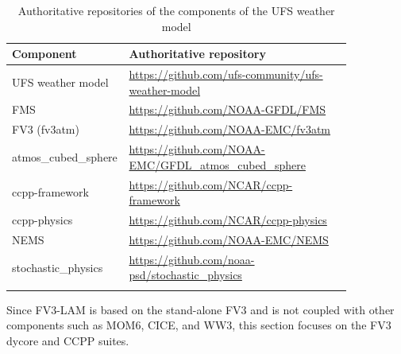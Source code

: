\documentclass[11pt,fleqn]{report}              %
\begin{document}
{
\fontsize{10}{12}\selectfont
\begin{longtable}{p{0.2\linewidth} | p{0.65\linewidth} }
\hline
\hline
 Component & Authoritative repository \\
\hline
 UFS weather model & \url{https://github.com/ufs-community/ufs-weather-model} \\
 FMS & \url{https://github.com/NOAA-GFDL/FMS} \\
 FV3 (fv3atm) & \url{https://github.com/NOAA-EMC/fv3atm} \\
 atmos\_cubed\_sphere & \url{https://github.com/NOAA-EMC/GFDL_atmos_cubed_sphere} \\
 ccpp-framework & \url{https://github.com/NCAR/ccpp-framework} \\
 ccpp-physics & \url{https://github.com/NCAR/ccpp-physics} \\
 NEMS & \url{https://github.com/NOAA-EMC/NEMS} \\
 stochastic\_physics & \url{https://github.com/noaa-psd/stochastic_physics} \\
\hline
\caption{Authoritative repositories of the components of the UFS weather model}
\label{table:repo_comp_ufsweather}
\end{longtable}
}


Since FV3-LAM is based on the stand-alone FV3 and is not coupled with other components such as MOM6, CICE, and WW3, this section focuses on the FV3 dycore and CCPP suites. 
\end{document}
